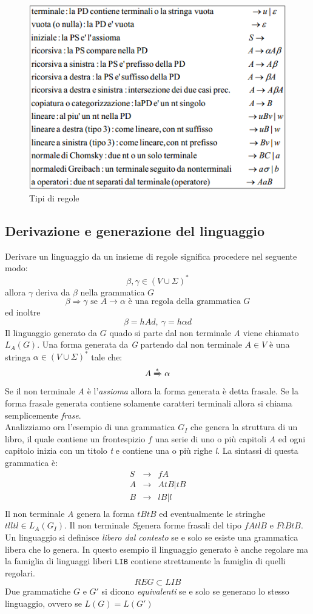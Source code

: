 \begin{figure}
	\centering
	\includegraphics[width=0.6\linewidth]{img/tipiregole.png}
	\caption{Tipi di regole}\label{fig:tipiregole}
\end{figure}
\subsection{Derivazione e generazione del linguaggio}
Derivare un linguaggio da un insieme di regole significa procedere nel seguente modo:
$$\beta,\gamma \in (V\cup\Sigma)^*$$
allora $ \gamma $ deriva da $ \beta $ nella grammatica $ G $ 
$$ \beta \Rightarrow \gamma \text{ se } A\rightarrow \alpha \text{ è una regola della grammatica } G$$
ed inoltre
$$\beta = hAd, \ \gamma = h\alpha d$$
Il linguaggio generato da $ G $ quado si parte dal non terminale \emph{A} viene chiamato $ L_A(G) $. Una forma generata da \emph{G} partendo dal non terminale $ A \in V $ è una stringa $ \alpha \in (V\cup \Sigma)^*$ tale che:
$$A\xRightarrow{*}\alpha$$
Se il non terminale \emph{A} è l'\emph{assioma} allora la forma generata è detta frasale. Se la forma frasale generata contiene solamente caratteri terminali allora si chiama semplicemente \emph{frase}.\\
Analizziamo ora l'esempio di una grammatica $ G_I $ che genera la struttura di un libro, il quale contiene un frontespizio $ f $ una serie di uno o più capitoli \emph{A} ed ogni capitolo inizia con un titolo \emph{t} e contiene una o più righe \emph{l}.
La sintassi di questa grammatica è:
$$
\begin{array}{lcl}
S & \rightarrow & fA\\
A & \rightarrow & AtB | tB\\
B & \rightarrow & lB | l\\
\end{array}
$$
Il non terminale \emph{A} genera la forma $ tBtB $ ed eventualmente le stringhe $ tlltl \in L_A(G_I) $. Il non terminale \emph{S}genera forme frasali del tipo $ fAtlB $ e $ FtBtB $.
Un linguaggio si definisce \emph{libero dal contesto} se e solo se esiste una grammatica libera che lo  genera.
In questo esempio il linguaggio generato è anche regolare ma la famiglia di linguaggi liberi \texttt{LIB} contiene strettamente la famiglia di quelli regolari.
$$REG\subset LIB$$
Due grammatiche $ G $ e $ G' $ si dicono \emph{equivalenti} se e solo se generano lo stesso linguaggio, ovvero se $ L(G) = L(G') $
